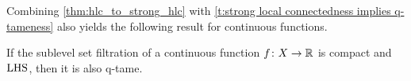 Combining \cref{thm:hlc_to_strong_hlc} with \cref{t:strong local connectedness implies q-tameness} also yields the following result for continuous functions.

\begin{cor}
    If the sublevel set filtration of a continuous function $f \colon X \to \mathbb{R}$ is compact and $\mathrm{LHS}$, then it is also q-tame.
\end{cor}


